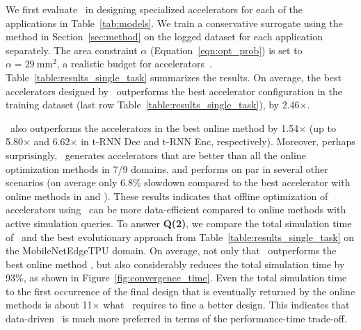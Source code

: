%
We first evaluate \primemethodname\ in designing specialized accelerators for each of the applications in Table~\ref{tab:models}.
%
We train a conservative surrogate using the method in Section~\ref{sec:method} on the logged dataset for each application separately.
%
The area constraint $\alpha$ (Equation~\ref{eqn:opt_prob}) is set to $\alpha = 29~\text{mm}^2$, a realistic budget for accelerators~\citep{yazdanbakhsh2021apollo}. Table~\ref{table:results_single_task} summarizes the results.
%
On average, the best accelerators designed by \primemethodname\ outperforms the best accelerator configuration in the training dataset (last row Table~\ref{table:results_single_task}), by 2.46$\times$.
%
 
%
\primemethodname\ also outperforms the accelerators in the best online method by 1.54$\times$ (up to 5.80$\times$ and 6.62$\times$ in t-RNN Dec and t-RNN Enc, respectively).
%
Moreover, perhaps surprisingly, \primemethodname\ generates accelerators that are better than all the online optimization methods in 7/9 domains, and performs on par in several other scenarios (on average only 6.8$\%$ slowdown compared to the best accelerator with online methods in \mfive and \msix). 
%
These results indicates that offline optimization of accelerators using \primemethodname\ can be more data-efficient compared to online methods with active simulation queries.
%
To answer \textbf{Q(2)}, we compare the total simulation time of \primemethodname\ and the best evolutionary approach from Table~\ref{table:results_single_task} on the MobileNetEdgeTPU domain.
%
On average, not only that \primemethodname\ outperforms the best online method , but also considerably reduces the total simulation time by 93\%, as shown in Figure~\ref{fig:convergence_time}.
% 
Even the total simulation time to the first occurrence of the final design that is eventually returned by the online methods is about 11$\times$ what \primemethodname\ requires to fine a better design.
%
This indicates that data-driven \primemethodname\ is much more preferred in terms of the performance-time trade-off.  

